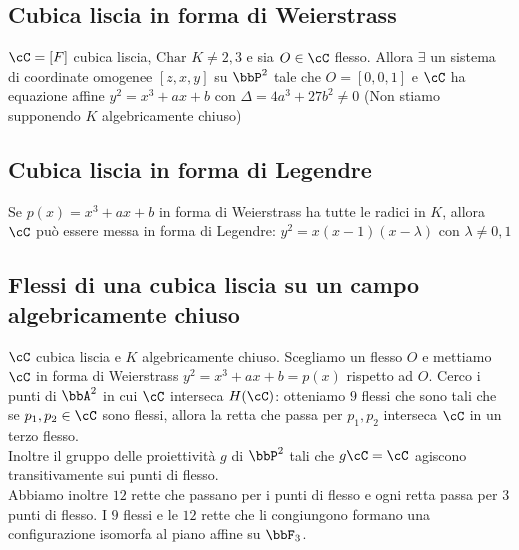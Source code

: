\documentclass[a4paper,NoNotes,GeneralMath]{stdmdoc}
\newcommand{\Char}{\text{Char }}
\begin{document}
	\subsection*{Cubica liscia in forma di Weierstrass}
	$\cC = [F]$ cubica liscia, $\Char K \neq 2,3$ e sia $O \in \cC$ flesso. Allora $\exists$ un sistema di coordinate omogenee $[z, x, y]$ su $\bbP^2$ tale che $O = [0, 0, 1]$ e $\cC$ ha equazione affine $y^2 = x^3 + ax + b$ con $\Delta = 4 a^3 + 27 b^2 \neq 0$ (Non stiamo supponendo $K$ algebricamente chiuso)
	
	\subsection*{Cubica liscia in forma di Legendre}
	Se $p(x) = x^3 + ax + b$ in forma di Weierstrass ha tutte le radici in $K$, allora $\cC$ può essere messa in forma di Legendre: $y^2 = x(x-1)(x-\lambda)$ con $\lambda \neq 0,1$
	
	\subsection*{Flessi di una cubica liscia su un campo algebricamente chiuso}
	$\cC$ cubica liscia e $K$ algebricamente chiuso. Scegliamo un flesso $O$ e mettiamo $\cC$ in forma di Weierstrass $y^2 = x^3 + ax + b = p(x)$ rispetto ad $O$. Cerco i punti di $\bbA^2$ in cui $\cC$ interseca $H(\cC)$: otteniamo $9$ flessi che sono tali che se $p_1, p_2 \in \cC$ sono flessi, allora la retta che passa per $p_1, p_2$ interseca $\cC$ in un terzo flesso. \\
	Inoltre il gruppo delle proiettività $g$ di $\bbP^2$ tali che $g \cC = \cC$ agiscono transitivamente sui punti di flesso. \\
	Abbiamo inoltre $12$ rette che passano per i punti di flesso e ogni retta passa per $3$ punti di flesso. I $9$ flessi e le $12$ rette che li congiungono formano una configurazione isomorfa al piano affine su $\bbF_3$.
	
\end{document}
